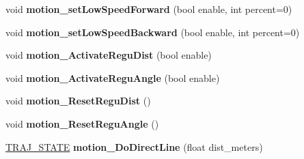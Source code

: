 \begin{DoxyCompactItemize}
\mbox{\label{classAsservDriver_a179a024ddd900587e4da74521f9b7f1a}} 
void {\bfseries motion\+\_\+set\+Low\+Speed\+Forward} (bool enable, int percent=0)
\item 
\mbox{\label{classAsservDriver_a713b553740e59136151e2c6886187713}} 
void {\bfseries motion\+\_\+set\+Low\+Speed\+Backward} (bool enable, int percent=0)
\item 
\mbox{\label{classAsservDriver_a48e4f69bf857d6a18098dc48615a61f1}} 
void {\bfseries motion\+\_\+\+Activate\+Regu\+Dist} (bool enable)
\item 
\mbox{\label{classAsservDriver_a846608b8033f7d592d2540b68de72eeb}} 
void {\bfseries motion\+\_\+\+Activate\+Regu\+Angle} (bool enable)
\item 
\mbox{\label{classAsservDriver_acb84d282c7e0b40d9b326b0fcb7a0c69}} 
void {\bfseries motion\+\_\+\+Reset\+Regu\+Dist} ()
\item 
\mbox{\label{classAsservDriver_acd102376cacdf0fc40a587f25359a25e}} 
void {\bfseries motion\+\_\+\+Reset\+Regu\+Angle} ()
\item 
\mbox{\label{classAsservDriver_a27f3a8fa56cc689d072a39efb1ed20b3}} 
\hyperlink{path__manager_8h_adb3360abeb29758da93865c8afcb80eb}{T\+R\+A\+J\+\_\+\+S\+T\+A\+TE} {\bfseries motion\+\_\+\+Do\+Direct\+Line} (float dist\+\_\+meters)
\end{DoxyCompactItemize}
